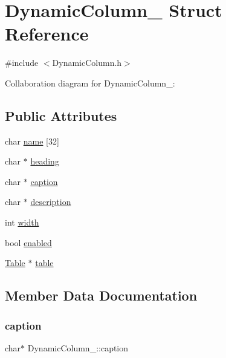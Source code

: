 \hypertarget{structDynamicColumn__}{}\section{Dynamic\+Column\+\_\+ Struct Reference}
\label{structDynamicColumn__}


{\ttfamily \#include $<$Dynamic\+Column.\+h$>$}



Collaboration diagram for Dynamic\+Column\+\_\+\+:
\subsection*{Public Attributes}
\begin{DoxyCompactItemize}
\item 
char \hyperlink{structDynamicColumn___afff6c83a16faf8eaedf1a60081b95e8e}{name} \mbox{[}32\mbox{]}
\item 
char $\ast$ \hyperlink{structDynamicColumn___a7f5b8deb548165dad04bb3e6c381090b}{heading}
\item 
char $\ast$ \hyperlink{structDynamicColumn___a3577a1f0b2290c858c90e1412aa47000}{caption}
\item 
char $\ast$ \hyperlink{structDynamicColumn___a01cc468c138e7bb7a081b104e44a29d6}{description}
\item 
int \hyperlink{structDynamicColumn___a9c73157c44a388cad5ff84b589dbfb97}{width}
\item 
bool \hyperlink{structDynamicColumn___ac108be018ce38982ce050c56be3f5a5f}{enabled}
\item 
\hyperlink{Table_8h_a799795dd983fdfee2e48cc52cdceb05d}{Table} $\ast$ \hyperlink{structDynamicColumn___a81a8abd511d7a671df2a70efdf244810}{table}
\end{DoxyCompactItemize}


\subsection{Member Data Documentation}
\mbox{\label{structDynamicColumn___a3577a1f0b2290c858c90e1412aa47000}} 
\subsubsection{\texorpdfstring{caption}{caption}}
{\footnotesize\ttfamily char$\ast$ Dynamic\+Column\+\_\+\+::caption}


